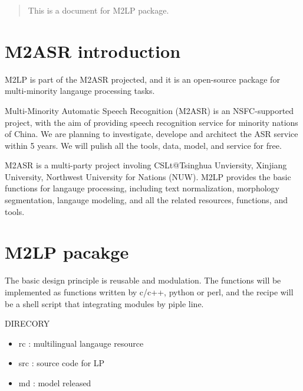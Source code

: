 \documentclass[12pt]{article}
\begin{document}
\maketitle

\begin{abstract}

This is a document for  M2LP package. 

\end{abstract}

\section{M2ASR introduction}

M2LP is part of the M2ASR projected, and it is an open-source package for multi-minority langauge processing tasks.

Multi-Minority Automatic Speech Recognition (M2ASR) is an NSFC-supported project, with the aim of providing speech recognition service for minority nations of China. We are planning to investigate, develope and architect the ASR service within 5 years. We will pulish all the tools, data, model, and service for free.

M2ASR is a multi-party project involing CSLt@Tsinghua Unviersity, Xinjiang University, Northwest University for Nations (NUW). M2LP provides the basic functions for langauge processing, including text normalization, morphology segmentation, langauge modeling, and all the related resources, functions, and tools.


\section{M2LP pacakge}

The basic design principle is reusable and modulation. The functions will be implemented as functions written by c/c++, python or perl, and the recipe will be a shell script that integrating modules by piple line.


DIRECORY

\begin{itemize}
\item rc : multilingual langauge resource
\item src : source code for LP
\item md : model released
\end{itemize}

%
%
\end{document}
